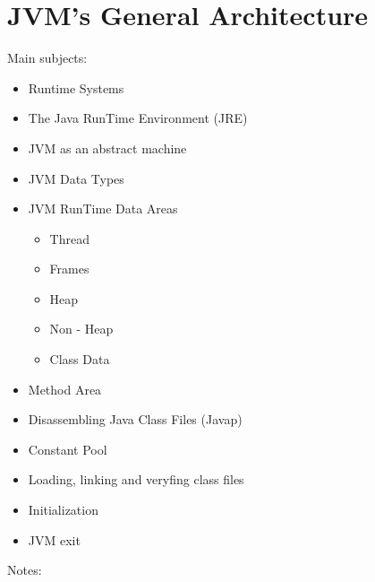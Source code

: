 \documentclass[a4paper,10pt]{article}
\begin{document}
\section{JVM's General Architecture}

Main subjects:

\begin{itemize}
    \item Runtime Systems
    \item The Java RunTime Environment (JRE)
    \item JVM as an abstract machine
    \item JVM Data Types
    \item JVM RunTime Data Areas
    \begin{itemize}
        \item Thread
        \item Frames
        \item Heap
        \item Non - Heap
        \item Class Data
    \end{itemize}
    \item Method Area
    \item Disassembling Java Class Files (Javap)
    \item Constant Pool
    \item Loading, linking and veryfing class files
    \item Initialization
    \item JVM exit
\end{itemize}

Notes:
\end{document}
